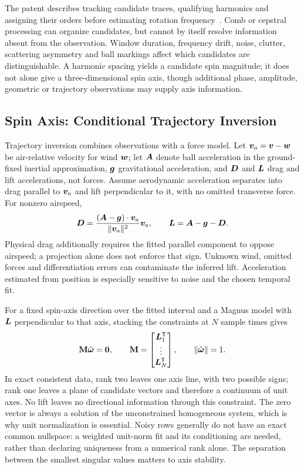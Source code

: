 The patent describes tracking candidate traces, qualifying harmonics and assigning their orders before estimating rotation frequency~\cite{us8845442}.
Comb or cepstral processing can organize candidates, but cannot by itself resolve information absent from the observation.
Window duration, frequency drift, noise, clutter, scattering asymmetry and ball markings affect which candidates are distinguishable.
A harmonic spacing yields a candidate spin magnitude; it does not alone give a three-dimensional spin axis, though additional phase, amplitude, geometric or trajectory observations may supply axis information.

\subsection{Spin Axis: Conditional Trajectory Inversion}
\label{sec:spinaxis}

Trajectory inversion combines observations with a force model.
Let $\bm{v}_a=\bm{v}-\bm{w}$ be air-relative velocity for wind $\bm{w}$; let $\bm{A}$ denote ball acceleration in the ground-fixed inertial approximation, $\bm{g}$ gravitational acceleration, and $\bm{D}$ and $\bm{L}$ drag and lift accelerations, not forces.
Assume aerodynamic acceleration separates into drag parallel to $\bm{v}_a$ and lift perpendicular to it, with no omitted transverse force.
For nonzero airspeed,
\begin{equation}
\label{eq:liftextract}
\bm{D}=\frac{(\bm{A}-\bm{g})\cdot\bm{v}_a}
{\lVert\bm{v}_a\rVert^2}\bm{v}_a,
\qquad
\bm{L}=\bm{A}-\bm{g}-\bm{D}.
\end{equation}
Physical drag additionally requires the fitted parallel component to oppose airspeed; a projection alone does not enforce that sign.
Unknown wind, omitted forces and differentiation errors can contaminate the inferred lift.
Acceleration estimated from position is especially sensitive to noise and the chosen temporal fit.

For a fixed spin-axis direction over the fitted interval and a Magnus model with $\bm{L}$ perpendicular to that axis, stacking the constraints at $N$ sample times gives
\begin{equation}
\label{eq:radaraxis}
\mathbf M\hat{\bm{\omega}}=\bm{0},
\qquad
\mathbf M=\begin{bmatrix}\bm{L}_1^{\mathsf T}\\\vdots\\\bm{L}_N^{\mathsf T}\end{bmatrix},
\qquad \lVert\hat{\bm{\omega}}\rVert=1.
\end{equation}
In exact consistent data, rank two leaves one axis line, with two possible signs; rank one leaves a plane of candidate vectors and therefore a continuum of unit axes.
No lift leaves no directional information through this constraint.
The zero vector is always a solution of the unconstrained homogeneous system, which is why unit normalization is essential.
Noisy rows generally do not have an exact common nullspace: a weighted unit-norm fit and its conditioning are needed, rather than declaring uniqueness from a numerical rank alone.
The separation between the smallest singular values matters to axis stability.

